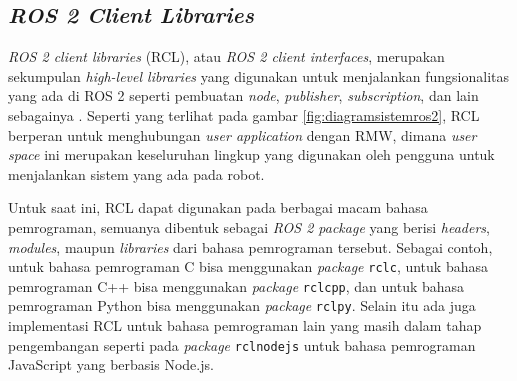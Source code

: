 \subsection{\emph{ROS 2 Client Libraries}}
\label{subsec:rcl}

\emph{ROS 2 client libraries} (RCL), atau \emph{ROS 2 client interfaces},
  merupakan sekumpulan \emph{high-level libraries} yang digunakan untuk menjalankan fungsionalitas yang ada di ROS 2 seperti pembuatan \emph{node}, \emph{publisher}, \emph{subscription}, dan lain sebagainya \citep{url:rclconcept}.
Seperti yang terlihat pada gambar \ref{fig:diagramsistemros2},
  RCL berperan untuk menghubungan \emph{user application} dengan RMW,
  dimana \emph{user space} ini merupakan keseluruhan lingkup yang digunakan oleh pengguna untuk menjalankan sistem yang ada pada robot.

Untuk saat ini, RCL dapat digunakan pada berbagai macam bahasa pemrograman,
  semuanya dibentuk sebagai \emph{ROS 2 package} yang berisi \emph{headers},
  \emph{modules}, maupun \emph{libraries} dari bahasa pemrograman tersebut.
Sebagai contoh, untuk bahasa pemrograman C bisa menggunakan \emph{package} \lstinline{rclc},
  untuk bahasa pemrograman C++ bisa menggunakan \emph{package} \lstinline{rclcpp},
  dan untuk bahasa pemrograman Python bisa menggunakan \emph{package} \lstinline{rclpy}.
Selain itu ada juga implementasi RCL untuk bahasa pemrograman lain yang masih dalam tahap pengembangan seperti pada \emph{package} \lstinline{rclnodejs} \citep{url:rclnodejs} untuk bahasa pemrograman JavaScript yang berbasis Node.js.
